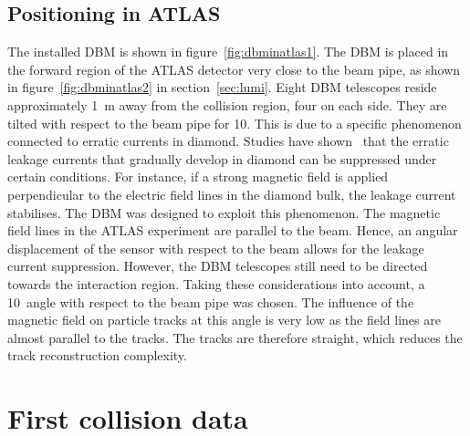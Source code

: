 \subsection{Positioning in ATLAS}
The installed DBM is shown in figure~\ref{fig:dbminatlas1}. The DBM is placed in the forward region of the ATLAS detector very close to the beam pipe, as shown in figure~\ref{fig:dbminatlas2} in section~\ref{sec:lumi}. Eight DBM telescopes reside approximately 1~m away from the collision region, four on each side. They are tilted with respect to the beam pipe for 10\textdegree. This is due to a specific phenomenon connected to erratic currents in diamond. Studies have shown~\cite{Mueller:1175553} that the erratic leakage currents that gradually develop in diamond can be suppressed under certain conditions. For instance, if a strong magnetic field is applied perpendicular to the electric field lines in the diamond bulk, the leakage current stabilises. The DBM was designed to exploit this phenomenon. The magnetic field lines in the ATLAS experiment are parallel to the beam. Hence, an angular displacement of the sensor with respect to the beam allows for the leakage current suppression. However, the DBM telescopes still need to be directed towards the interaction region. Taking these considerations into account, a 10\textdegree~angle with respect to the beam pipe was chosen. The influence of the magnetic field on particle tracks at this angle is very low as the field lines are almost parallel to the tracks. The tracks are therefore straight, which reduces the track reconstruction complexity.




\clearpage
\section{First collision data}
\label{sec:operation}


